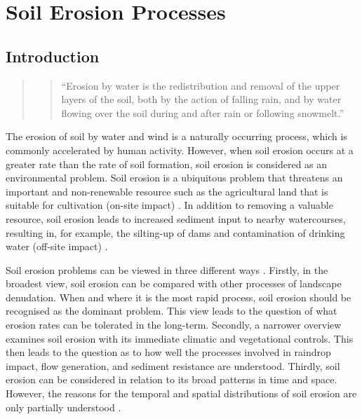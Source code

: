\section{Soil Erosion Processes}
\label{sec:SoilErosionProcesses}

\subsection{Introduction}
\label{sec:ErosionProcessesIntroduction}

\begin{quote}
  \begin{quote}
    ``Erosion by water is the redistribution and removal of the
upper layers of the soil, both by the action of falling rain, and by water
flowing over the soil during and after rain or following snowmelt.''
\citep{favis-mortlock2002-452}
  \end{quote}
\end{quote}

The erosion of soil by water and wind is a naturally occurring process, which is
commonly accelerated by human activity. However, when soil erosion occurs at a
greater rate than the rate of soil formation, soil erosion is considered as an
environmental problem. Soil erosion is a ubiquitous problem that threatens an
important and non-renewable resource such as the agricultural land that is
suitable for cultivation (on-site impact) \citep{boardman2003-176}. In addition
to removing a valuable resource, soil erosion leads to increased sediment input
to nearby watercourses, resulting in, for example, the silting-up of dams and
contamination of drinking water (off-site impact)
\citep{mejia1994-331,kitchen1998-179}.

Soil erosion problems can be viewed in three different ways
\citep{kirkby1980-312}. Firstly, in the broadest view, soil erosion can be
compared with other processes of landscape denudation. When and where it is the
most rapid process, soil erosion should be recognised as the dominant problem.
This view leads to the question of what erosion rates can be tolerated in the
long-term. Secondly, a narrower overview examines soil erosion with its
immediate climatic and vegetational controls. This then leads to the question as
to how well the processes involved in raindrop impact, flow generation, and
sediment resistance are understood. Thirdly, soil erosion can be considered in
relation to its broad patterns in time and space. However, the reasons for the
temporal and spatial distributions of soil erosion are only partially understood
\citep{quine2002-55,gomez2005-143,wakiyama2010-993}.

